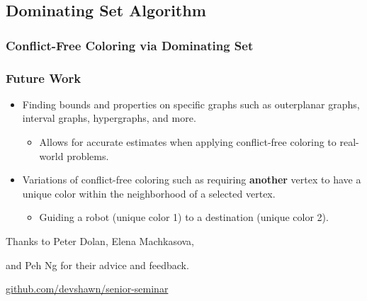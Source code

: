 \documentclass[xcolor=dvipsnames,aspectratio=1610]{beamer}
\begin{document}
  \subsection{Dominating Set Algorithm}
  \begin{frame}
    \frametitle{Conflict-Free Coloring via Dominating Set}

    
  \end{frame}

  \begin{frame}
    \frametitle{Future Work}

    \begin{itemize}
      \item Finding bounds and properties on specific graphs such as outerplanar graphs, interval graphs, hypergraphs, and more.
      \pause
      \vfill
      \begin{itemize}
        \item Allows for accurate estimates when applying conflict-free coloring to real-world problems.
      \end{itemize}
      \pause
      \vfill
      \item Variations of conflict-free coloring such as requiring \textbf{another} vertex to have a unique color within the neighborhood of a selected vertex.
      \pause
      \vfill
      \begin{itemize}
        \item Guiding a robot (unique color 1) to a destination (unique color 2).
      \end{itemize}
    \end{itemize}

  \end{frame}

  \begin{frame}[standout]
    \centering
    {Thanks to Peter Dolan, Elena Machkasova,

    and Peh Ng for their advice and feedback.}
    \vfill
    \href{https://github.com/devshawn/senior-seminar}{github.com/devshawn/senior-seminar}
    \vfill
    \ccbyncsa{}
  \end{frame}
\end{document}

